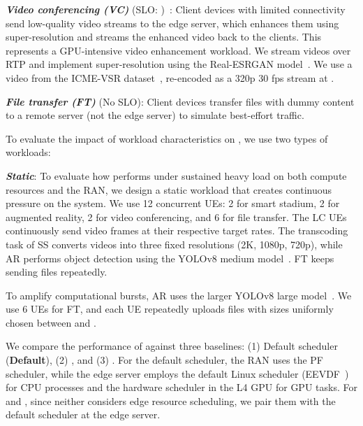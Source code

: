 \noindent\textit{\textbf{Video conferencing (VC)}} (SLO: )~\cite{www-zoom-latency,www-wikipedia-audio-latency}: Client devices with limited connectivity send low-quality video streams to the edge server, which enhances them using super-resolution and streams the enhanced video back to the clients.
This represents a GPU-intensive video enhancement workload.
We stream videos over RTP and implement super-resolution using the Real-ESRGAN model~\cite{wang2021realesrgan}.
We use a video from the ICME-VSR dataset~\cite{naderi2025icme}, re-encoded as a 320p 30 fps stream at .

\noindent\textit{\textbf{File transfer (FT)}} (No SLO): Client devices transfer files with dummy content to a remote server (not the edge server) to simulate best-effort traffic.


To evaluate the impact of workload characteristics on \sys{}, we use two types of workloads:

\noindent \textit{\textbf{Static}}:
To evaluate how \sys{} performs under sustained heavy load on both compute resources and the RAN, we design a static workload that creates continuous pressure on the system.
We use 12 concurrent UEs: 2 for smart stadium, 2 for augmented reality, 2 for video conferencing, and 6 for file transfer.
The LC UEs continuously send video frames at their respective target rates.
The transcoding task of SS converts videos into three fixed resolutions (2K, 1080p, 720p), while AR performs object detection using the YOLOv8 medium model~\cite{yolov8}.
FT keeps sending  files repeatedly.

To amplify computational bursts, AR uses the larger YOLOv8 large model~\cite{yolov8}.
We use 6 UEs for FT, and each UE repeatedly uploads files with sizes uniformly chosen between  and .

We compare the performance of \sys{} against three baselines: (1) Default scheduler (\textbf{Default}), (2) \textbf{\tutti{}}, and (3) \textbf{\arma{}}.
For the default scheduler, the RAN uses the PF scheduler, while the edge server employs the default Linux scheduler (EEVDF~\cite{eevdf}) for CPU processes and the hardware scheduler in the L4 GPU for GPU tasks. 
For \tutti{} and \arma{}, since neither considers edge resource scheduling, we pair them with the default scheduler at the edge server.

